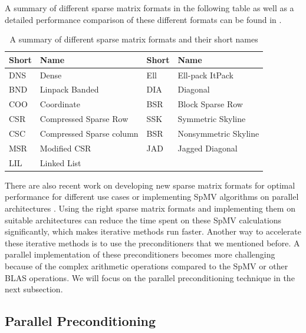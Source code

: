 A summary of different sparse matrix formats in the following table as well as a detailed performance comparison of these different formats can be found in \citep{stanimirovic2009performance}.
\begin{table}[h!]
\begin{tabular}{llll}
\toprule
Short & Name  & Short & Name            \\
\midrule
DNS        & Dense & Ell        & Ell-pack ItPack \\
BND           & Linpack Banded      &  DIA            & Diagonal                \\
COO           & Coordinate      & BSR           &  Block Sparse Row               \\
CSR           & Compressed Sparse Row      &    SSK        &    Symmetric Skyline             \\
CSC           &  Compressed Sparse column      & BSR           &  Nonsymmetric Skyline               \\
MSR           & Modified CSR       &    JAD        &    Jagged Diagonal             \\
    LIL       & Linked List      &            &                \\
\bottomrule
\end{tabular}
\caption{A summary of different sparse matrix formats and their short names}
\end{table}
There are also recent work on developing new sparse matrix formats for optimal performance for different use cases \citep{smailbegovic2005sparse,dongarraxz1994sparse} or implementing SpMV algorithms on parallel architectures \citep{bell2009,yan2014yaspmv,li2014performance}. Using the right sparse matrix formats and implementing them on suitable architectures can reduce the time spent on these SpMV calculations significantly, which makes iterative methods run faster. Another way to accelerate these iterative methods is to use the preconditioners that we mentioned before. A parallel implementation of these preconditioners becomes more challenging because of the complex arithmetic operations compared to the SpMV or other BLAS operations. We will focus on the parallel preconditioning technique in the next subsection.




\subsection{Parallel Preconditioning}

